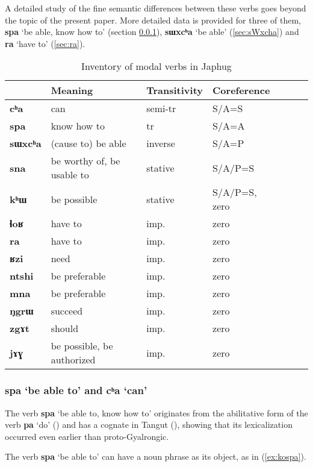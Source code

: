 \documentclass[oneside,a4paper,11pt]{article}
\newcommand{\ipa}[1]{\textbf{\phon#1}} %
\newcommand{\jpg}[2]{\ipa{#1} `#2'} %
\newcommand{\refb}[1]{(\ref{#1})}
\begin{document}
A detailed study of the fine semantic differences between these verbs goes beyond the topic of the present paper. More detailed data is provided for three of them, \jpg{spa}{be able, know how to} (section \ref{sec:spa}), \jpg{sɯxcʰa}{be able} (\ref{sec:sWxcha}) and \jpg{ra}{have to} (\ref{sec:ra}).

\begin{table}[H]
\caption{Inventory of modal verbs in Japhug} \centering \label{tab:modal.verbs}
\begin{tabular}{lllllll}
\toprule
 & 	Meaning & 	Transitivity & 	Coreference & 	\\
 \midrule
\ipa{cʰa} & 	can & 	semi-tr & 	S/A=S & 	\\
\ipa{spa} & 	know how to & 	tr & 	S/A=A & 	\\
\ipa{sɯxcʰa} & 	(cause to) be able & 	inverse & 	S/A=P & 	\\
\ipa{sna} & 	be worthy of, be usable to & 	stative & 	S/A/P=S & 	\\
\ipa{kʰɯ} & 	be possible & 	stative & 	S/A/P=S, zero & 	\\
\midrule
\ipa{ɬoʁ} & 	have to & 	imp. & 	zero & 	\\
\ipa{ra} & 	have to & 	imp. & 	zero & 	\\
\ipa{ʁzi} & 	need & 	imp. & 	zero & 	\\
\ipa{ntshi} & 	be preferable & 	imp. & 	zero & 	\\
\ipa{mna} & 	be preferable & 	imp. & 	zero & 	\\
\ipa{ŋgrɯ} & 	succeed & 	imp. & 	zero & 	\\
\ipa{zgɤt} & 	should & 	imp. & 	zero & 	\\
\ipa{jɤɣ} & 	be possible, be authorized & 	imp. & 	zero & 	\\
\bottomrule
\end{tabular}
\end{table}

\subsubsection{\jpg{spa}{be able to} and \jpg{cʰa}{can}} \label{sec:spa}
The verb \jpg{spa}{be able to, know how to} originates from the abilitative form of the verb \ipa{pa} `do' (\citealt{jacques15causative}) and has a cognate in Tangut  (\citealt{jacques14esquisse}), showing that its lexicalization occurred even earlier than proto-Gyalrongic.

The verb \jpg{spa}{be able to} can have a noun phrase as its object, as  in \refb{ex:kospa}.
\end{document}
